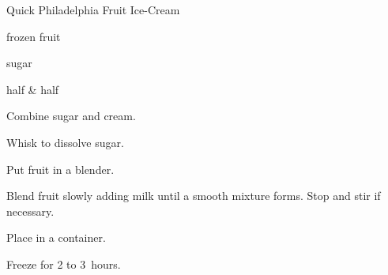 \begin{recipe}{Quick Philadelphia Fruit Ice-Cream}{}{}

\begin{ingredients}
\item {} frozen fruit
\item \C{1\third} sugar
\item {} half \& half
\end{ingredients}

\begin{directions}
\item Combine sugar and cream.
\item Whisk to dissolve sugar.
\item Put fruit in a blender.
\item Blend fruit slowly adding milk until a smooth mixture forms. Stop and stir if necessary.
\item Place in a container.
\item Freeze for 2 to 3~hours.
\end{directions}

\end{recipe}
